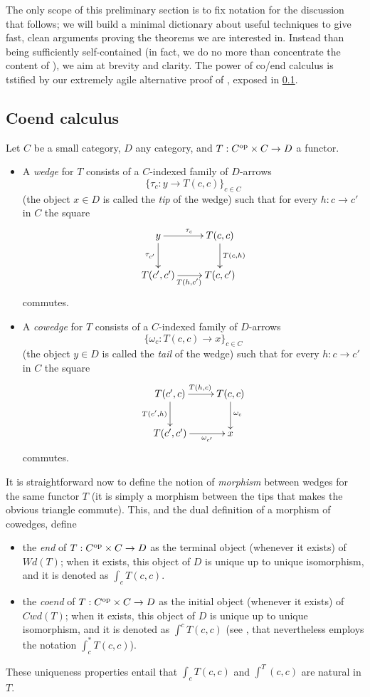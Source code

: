 The only scope of this preliminary section is to fix notation for the discussion that follows; we will build a minimal dictionary about useful techniques to give fast, clean arguments proving the theorems we are interested in. Instead than being sufficiently self-contained (in fact, we do no more than concentrate the content of \cite[§1,2]{cofriend}), we aim at brevity and clarity. The power of co/end calculus is tstified by our extremely agile alternative proof of \cite[???]{adamek2002classification}, exposed in \ref{}.
\subsection{Coend calculus}
\begin{definition}[Co/wedges]
Let $C$ be a small category, $D$ any category, and $T : C^{\text{op}}\times C \to D$ a functor.
\begin{itemize}
	\item A \emph{wedge} for $T$ consists of a $C$-indexed family of $D$-arrows
	\[
	\{\tau_c : y\to T(c,c)\}_{c\in C}
	\]
	(the object $x\in D$ is called the \emph{tip} of the wedge) such that for every $h : c\to c'$ in $C$ the square
	\[\xymatrix{y \ar[r]^{\tau_c}\ar[d]_{\tau_{c'}}& T(c,c) \ar[d]^{T(c,h)}\\T(c',c') \ar[r]_{T(h,c')}& T(c,c')}\]
	commutes.
	\item A \emph{cowedge} for $T$ consists of a $C$-indexed family of $D$-arrows
	\[
	\{\omega_c : T(c,c)\to x\}_{c\in C}
	\]
	(the object $y\in D$ is called the \emph{tail} of the wedge) such that for every $h : c\to c'$ in $C$ the square
	\[\xymatrix{T(c',c) \ar[r]^{T(h,c)}\ar[d]_{T(c',h)}& T(c,c)\ar[d]^{\omega_c}\\ T(c',c')\ar[r]_-{\omega_{c'}} & x}\]
	commutes.
\end{itemize}
\end{definition}
\begin{definition}
It is straightforward now to define the notion of \emph{morphism} between wedges for the same functor $T$ (it is simply a morphism between the tips that makes the obvious triangle commute). This, and the dual definition of a morphism of cowedges, define
\begin{itemize}
	\item the \emph{end} of $T :C^{\text{op}}\times C \to D$ as the terminal object (whenever it exists) of $Wd(T)$; when it exists, this object of $D$ is unique up to unique isomorphism, and it is denoted as $\int_c T(c,c)$.
	\item the \emph{coend} of $T :C^{\text{op}}\times C \to D$ as the initial object (whenever it exists) of $Cwd(T)$; when it exists, this object of $D$ is unique up to unique isomorphism, and it is denoted as $\int^c T(c,c)$ (see \cite{yoneda}, that nevertheless employs the notation $\int_c^* T(c,c)$).
\end{itemize}
These uniqueness properties entail that $\int_c T(c,c)$ and $\int^T(c,c)$ are natural in $T$.
\end{definition}

